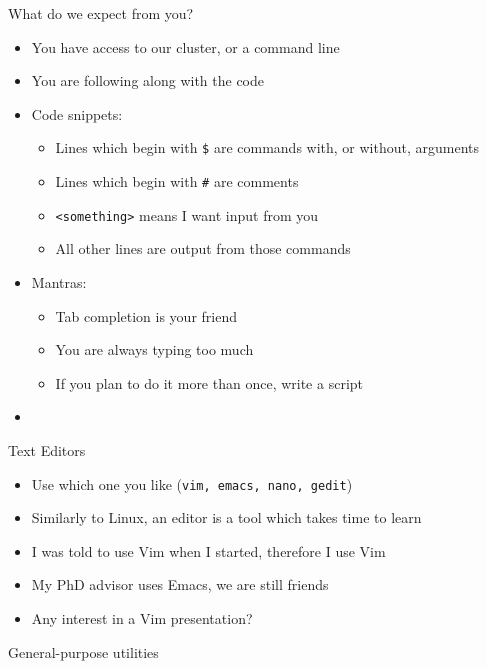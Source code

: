 \documentclass[hyperref={pdfpagelabels=false},12pt]{beamer}
\newcommand{\myvbutton}[2]{\vfill\hyperlink{#1}{\beamerbutton{{#2}}}}
\begin{document}
\begin{frame}{What do we expect from you?}
    \begin{itemize}
        \item You have access to our cluster, or a command line
        \item You are following along with the code
        \item Code snippets:
        \begin{itemize}
            \item Lines which begin with \texttt{\$} are commands with, or without, arguments
            \item Lines which begin with \texttt{\#} are comments
            \item \texttt{\textless something\textgreater} means I want input from you
            \item All other lines are output from those commands
        \end{itemize}
        \item Mantras:
        \begin{itemize}
            \item Tab completion is your friend
            \item You are always typing too much
            \item If you plan to do it more than once, write a script
        \end{itemize}
        \item \color{red}{Type what you see, experiment!}
    \end{itemize}
\end{frame}

\begin{frame}{Text Editors}
    \begin{itemize}
        \item Use which one you like (\texttt{vim, emacs, nano, gedit}) 
        \item Similarly to Linux, an editor is a tool which takes time to learn
        \item I was told to use Vim when I started, therefore I use Vim
        \item My PhD advisor uses Emacs, we are still friends
        \item Any interest in a Vim presentation?
    \end{itemize}
\end{frame}

\begin{frame}[label=general-1]{General-purpose utilities}
\inputminted[bgcolor=lightgray,linenos,fontsize=\footnotesize]{bash}{code/general-purpose-utilities-1.txt}
\myvbutton{exercises-1}{Exercises (1)}
\end{frame}
\end{document}
